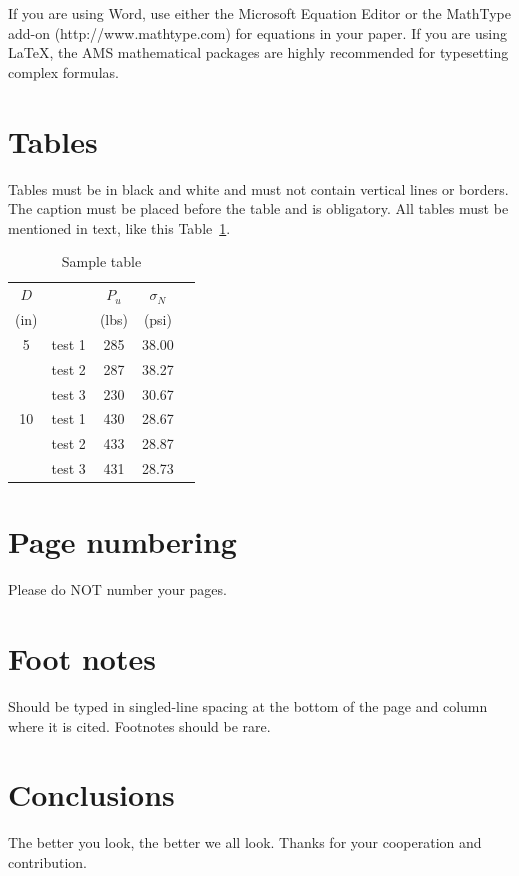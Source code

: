 \documentclass{jcst}
\begin{document}
 If you are using Word, use either the Microsoft Equation Editor or the MathType add-on
(http://www.mathtype.com) for equations in your paper. If you are using LaTeX, the
AMS mathematical packages are highly recommended for typesetting complex formulas.

\section{Tables}

Tables must be in black and white and must not contain vertical lines or borders.
The caption must be placed before the table and is obligatory. All tables must be mentioned in text, like this Table~\ref{tab:sampletable}.

\begin{table}[ht]
\caption{\label{tab:sampletable}Sample table}
\centering
\begin{tabular}{clccc}
\toprule
$D$ &               & $P_u$      & $\sigma_N$    \\
(in)&               & (lbs)      & (psi)          \\ \otoprule
%
5    & test 1      & 285         & 38.00          \\
& test 2      & 287         & 38.27          \\
& test 3      & 230         & 30.67          \\ \midrule
10   & test 1      & 430         & 28.67          \\
& test 2      & 433         & 28.87          \\
& test 3      & 431         & 28.73          \\ \bottomrule
\end{tabular}
\end{table}


\section{Page numbering}
Please do NOT number your pages.

\section{Foot notes}
Should be typed in singled-line spacing at the bottom of the page and column where it is cited. Footnotes should be rare.

\section{Conclusions}
The better you look, the better we all look. Thanks for your cooperation and contribution.
\end{document}

